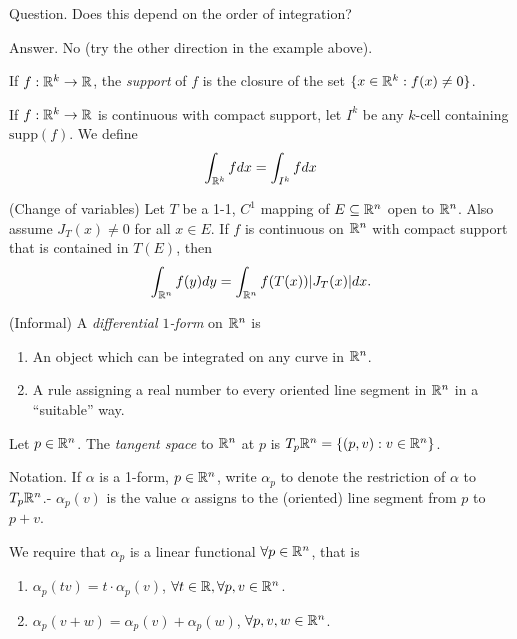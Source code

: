 \documentclass[11pt]{article}
\begin{document}
Question. Does this depend on the order of integration?

Answer. No (try the other direction in the example above).

\begin{definition}
  If $f : \mathbb{R}^k \to \mathbb{R}$, the \emph{support} of $f$ is the closure of the set $\{ x \in \mathbb{R}^k : f(x) \neq 0 \}$.
\end{definition}

If $f: \mathbb{R}^k \to \mathbb{R}$ is continuous with compact support, let $I^k$ be any $k$-cell containing $\mathrm{supp}(f)$. We define $$\int_{\mathbb{R}^k} f dx = \int_{I^k} f dx$$

\begin{theorem} (Change of variables) Let $T$ be a 1-1, $C^1$ mapping of $E \subseteq \mathbb{R}^n$ open to $\mathbb{R}^n$. Also assume $J_T(x) \neq 0$ for all $x \in E$. If $f$ is continuous on $\mathbb{R}^n$ with compact support that is contained in $T(E)$, then $$\int_{\mathbb{R}^n} f(y) dy = \int_{\mathbb{R}^n} f(T(x))|J_T(x)|dx.$$
\end{theorem}

\begin{definition} (Informal) A \emph{differential $1$-form} on $\mathbb{R}^n$ is \begin{enumerate}
  \item An object which can be integrated on any curve in $\mathbb{R}^n$.
  \item A rule assigning a real number to every oriented line segment in $\mathbb{R}^n$ in a ``suitable'' way.
  \end{enumerate}
\end{definition}

\begin{definition} Let $p \in \mathbb{R}^n$. The \emph{tangent space} to $\mathbb{R}^n$ at $p$ is $T_p \mathbb{R}^n = \{ (p, v) : v \in \mathbb{R}^n \}$.
\end{definition}

Notation. If $\alpha$ is a 1-form, $p \in \mathbb{R}^n$, write $\alpha_p$ to denote the restriction of $\alpha$ to $T_p \mathbb{R}^n$.- $\alpha_p(v)$ is the value $\alpha$ assigns to the (oriented) line segment from $p$ to $p + v$.

We require that $\alpha_p$ is a linear functional $\forall p \in \mathbb{R}^n$, that is \begin{enumerate}
\item $\alpha_p(tv) = t \cdot \alpha_p(v)$, $\forall t \in \mathbb{R}, \forall p, v \in \mathbb{R}^n$.
\item $\alpha_p(v + w) = \alpha_p(v) + \alpha_p(w)$, $\forall p, v, w \in \mathbb{R}^n$.
\end{enumerate}
\end{document}
